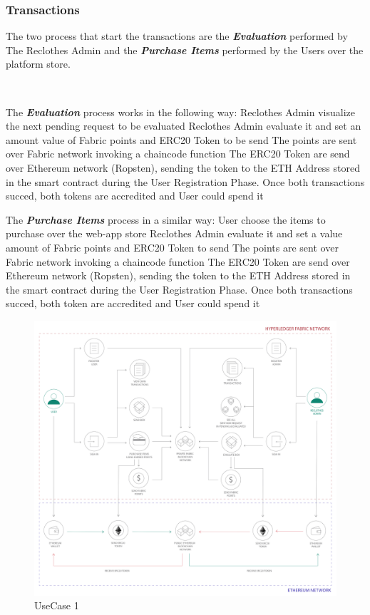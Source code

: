 {\subsubsection{Transactions}

The two process that start the transactions are the \textit{\bf{Evaluation}} performed by The Reclothes Admin
and the \textit{\bf{Purchase Items}} performed by the Users over the platform store. 

\\

\begin{outline}[enumerate]
    \1 The \textit{\bf{Evaluation}} process works in the following way:
    \2 Reclothes Admin visualize the next pending request to be evaluated
    \2 Reclothes Admin evaluate it and set an amount value of Fabric points and ERC20 Token to be send
    \3 The points are sent over Fabric network invoking a chaincode function
    \3 The ERC20 Token are send over Ethereum network (Ropsten), sending the token to the ETH Address stored
        in the smart contract during the User Registration Phase.
    \2 Once both transactions succed, both tokens are accredited and User could spend it

    \1 The \textit{\bf{Purchase Items}} process in a similar way:
    \2 User choose the items to purchase over the web-app store
    \2 Reclothes Admin evaluate it and set a value amount of Fabric points and ERC20 Token to send
    \3 The points are sent over Fabric network invoking a chaincode function
    \3 The ERC20 Token are send over Ethereum network (Ropsten), sending the token to the ETH Address stored
        in the smart contract during the User Registration Phase.
    \2 Once both transactions succed, both token are accredited and User could spend it
\end{outline}

\begin{figure}[h!]
	\centering
	\includegraphics[totalheight=15cm]{img/use_case1.png}
	\caption{UseCase 1}
	\label{fig:usecase1}
\end{figure}


}
